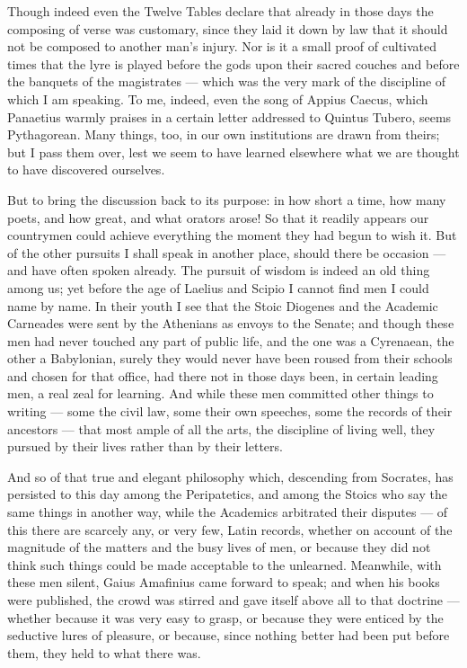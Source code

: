  Though indeed even the Twelve Tables declare that already in those days the composing of verse was customary, since they laid it down by law that it should not be composed to another man's injury. Nor is it a small proof of cultivated times that the lyre is played before the gods upon their sacred couches and before the banquets of the magistrates — which was the very mark of the discipline of which I am speaking. To me, indeed, even the song of Appius Caecus, which Panaetius warmly praises in a certain letter addressed to Quintus Tubero, seems Pythagorean. Many things, too, in our own institutions are drawn from theirs; but I pass them over, lest we seem to have learned elsewhere what we are thought to have discovered ourselves.

 But to bring the discussion back to its purpose: in how short a time, how many poets, and how great, and what orators arose! So that it readily appears our countrymen could achieve everything the moment they had begun to wish it. But of the other pursuits I shall speak in another place, should there be occasion — and have often spoken already. The pursuit of wisdom is indeed an old thing among us; yet before the age of Laelius and Scipio I cannot find men I could name by name. In their youth I see that the Stoic Diogenes and the Academic Carneades were sent by the Athenians as envoys to the Senate; and though these men had never touched any part of public life, and the one was a Cyrenaean, the other a Babylonian, surely they would never have been roused from their schools and chosen for that office, had there not in those days been, in certain leading men, a real zeal for learning. And while these men committed other things to writing — some the civil law, some their own speeches, some the records of their ancestors — that most ample of all the arts, the discipline of living well, they pursued by their lives rather than by their letters.

 And so of that true and elegant philosophy which, descending from Socrates, has persisted to this day among the Peripatetics, and among the Stoics who say the same things in another way, while the Academics arbitrated their disputes — of this there are scarcely any, or very few, Latin records, whether on account of the magnitude of the matters and the busy lives of men, or because they did not think such things could be made acceptable to the unlearned. Meanwhile, with these men silent, Gaius Amafinius came forward to speak; and when his books were published, the crowd was stirred and gave itself above all to that doctrine — whether because it was very easy to grasp, or because they were enticed by the seductive lures of pleasure, or because, since nothing better had been put before them, they held to what there was.


